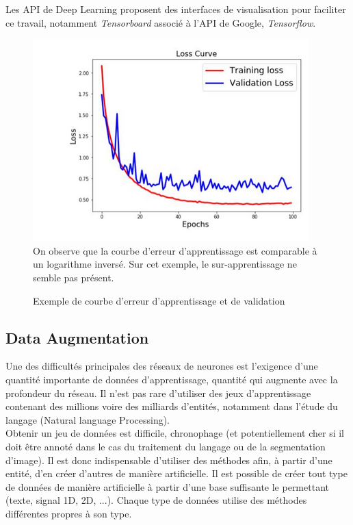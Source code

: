 \noindent Les API de Deep Learning proposent des interfaces de visualisation pour faciliter ce travail, notamment \textit{Tensorboard} associé à l'API de Google, \textit{Tensorflow}.

\begin{figure}
    \centering
    \includegraphics[scale=0.4]{./tex/regularisation/earlystop.png}\\

    On observe que la courbe d'erreur d'apprentissage est comparable à un logarithme inversé. Sur cet exemple, le sur-apprentissage ne semble pas présent.
    \caption{Exemple de courbe d'erreur d'apprentissage et de validation}
    \label{earlystop}
\end{figure}

\subsection{Data Augmentation}

Une des difficultés principales des réseaux de neurones est l'exigence d'une quantité importante de données d'apprentissage, quantité qui augmente avec la profondeur du réseau. Il n'est pas rare d'utiliser des jeux d'apprentissage contenant des millions voire des milliards d'entités, notamment dans l'étude du langage (Natural language Processing). \\

\noindent Obtenir un jeu de données est difficile, chronophage (et potentiellement cher si il doit être annoté dans le cas du traitement du langage ou de la segmentation d'image). Il est donc indispensable d'utiliser des méthodes afin, à partir d'une entité, d'en créer d'autres de manière artificielle. Il est possible de créer tout type de données de manière artificielle à partir d'une base suffisante le permettant (texte, signal 1D, 2D, ...). Chaque type de données utilise des méthodes différentes propres à son type. \\

